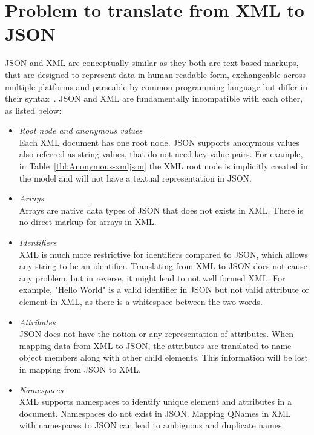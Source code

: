 \section{Problem to translate from XML to JSON}
JSON and XML are conceptually similar as they both are text based markups, that are designed to represent data in human-readable form, exchangeable across multiple platforms and parseable by common programming language but differ in their syntax~\citep{lee2011jxon}. JSON and XML are fundamentally incompatible with each other, as listed below:
\begin{itemize}
\item \textit{Root node and anonymous values}
\\
Each XML document has one root node. JSON supports anonymous values also referred as string values, that do not need key-value pairs. For example, in Table~\ref{tbl:Anonymous-xmljson} the XML root node is implicitly created in the model and will not have a textual representation in JSON.

	\item \textit{Arrays}\\
		Arrays are native data types of JSON that does not exists in XML. There is no direct markup for arrays in XML.
		\item \textit{Identifiers}\\
		XML is much more restrictive for identifiers compared to JSON, which allows any string to be an identifier. Translating from XML to JSON does not cause any problem, but in reverse, it might lead to not well formed XML. For example, "Hello World" is a valid identifier in JSON but not valid attribute or element in XML, as there is a whitespace between the two words.
		\item \textit{Attributes}\\
		JSON does not have the notion or any representation of attributes. When mapping data from XML to JSON, the attributes are translated to name object members along with other child elements. This information will be lost in mapping from JSON to XML.
		\item \textit{Namespaces}\\
		XML supports namespaces to identify  unique element and attributes in a document. Namespaces do not exist in JSON. Mapping QNames in XML with namespaces to JSON can lead to ambiguous and duplicate names.
\end{itemize}

